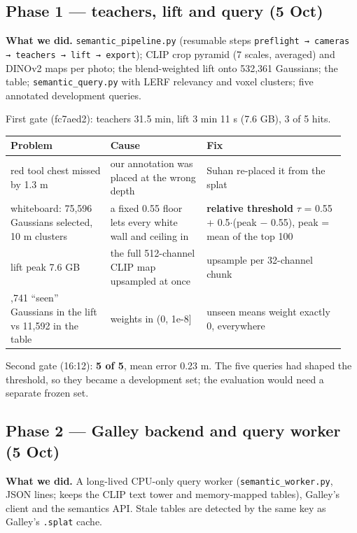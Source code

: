 \documentclass[11pt,a4paper]{article}
\newcommand{\code}[1]{\texttt{#1}}
\begin{document}
\subsection{Phase 1 — teachers, lift and query (5 Oct)}
\textbf{What we did.} \code{semantic\_\allowbreak{}pipeline.py} (resumable steps \code{preflight → cameras → teachers → lift → export}); CLIP crop pyramid (7 scales, averaged) and DINOv2 maps per photo; the blend-weighted lift onto 532,361 Gaussians; the table; \code{semantic\_\allowbreak{}query.py} with LERF relevancy and voxel clusters; five annotated development queries.

First gate (fc7aed2): teachers 31.5 min, lift 3 min 11 s (7.6 GB), 3 of 5 hits.

\begin{center}\small
\begin{tabular}{@{}>{\raggedright\arraybackslash}p{0.286\linewidth}>{\raggedright\arraybackslash}p{0.272\linewidth}>{\raggedright\arraybackslash}p{0.390\linewidth}@{}}
\toprule
\textbf{Problem} & \textbf{Cause} & \textbf{Fix} \\
\midrule
red tool chest missed by 1.3 m & our annotation was placed at the wrong depth & Suhan re-placed it from the splat \\
whiteboard: 75,596 Gaussians selected, 10 m clusters & a fixed 0.55 floor lets every white wall and ceiling in & \textbf{relative threshold} $\tau$ = 0.55 + 0.5$\cdot$(peak $-$ 0.55), peak = mean of the top 100 \\
lift peak 7.6 GB & the full 512-channel CLIP map upsampled at once & upsample per 32-channel chunk \\
10,741 ``seen'' Gaussians in the lift vs 11,592 in the table & weights in (0, 1e-8] & unseen means weight exactly 0, everywhere \\
\bottomrule
\end{tabular}
\end{center}
Second gate (16:12): \textbf{5 of 5}, mean error 0.23 m. The five queries had shaped the threshold, so they became a development set; the evaluation would need a separate frozen set.

\subsection{Phase 2 — Galley backend and query worker (5 Oct)}
\textbf{What we did.} A long-lived CPU-only query worker (\code{semantic\_\allowbreak{}worker.py}, JSON lines; keeps the CLIP text tower and memory-mapped tables), Galley's client and the semantics API. Stale tables are detected by the same key as Galley's \code{.splat} cache.
\end{document}
